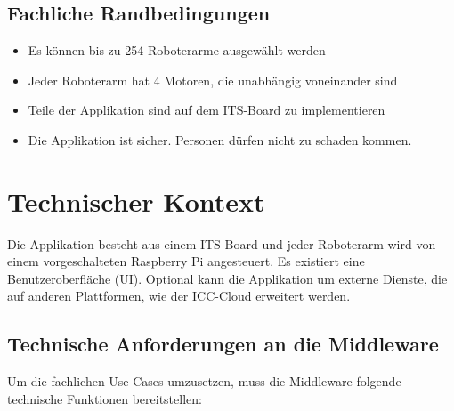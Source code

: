 \subsection{Fachliche Randbedingungen}

\begin{itemize}
	\item Es können bis zu 254 Roboterarme ausgewählt werden
	\item Jeder Roboterarm hat 4 Motoren, die unabhängig voneinander sind
	\item Teile der Applikation sind auf dem ITS-Board zu implementieren
	\item Die Applikation ist sicher. Personen dürfen nicht zu schaden kommen.
	
\end{itemize}



\section{Technischer Kontext}

Die Applikation besteht aus einem ITS-Board und jeder Roboterarm wird von einem vorgeschalteten Raspberry Pi angesteuert. Es existiert eine Benutzeroberfläche (UI). Optional kann die Applikation um externe Dienste, die auf anderen Plattformen, wie der ICC-Cloud erweitert werden.

\subsection{Technische Anforderungen an die Middleware}

Um die fachlichen Use Cases umzusetzen, muss die Middleware folgende technische Funktionen bereitstellen:

